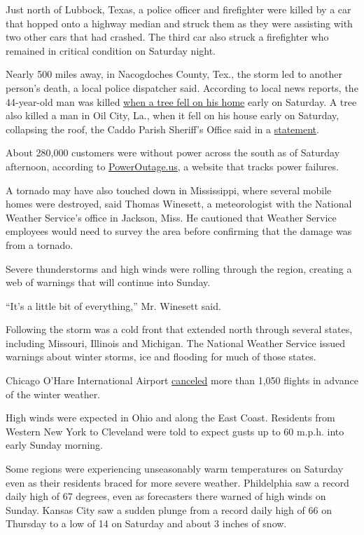 Just north of Lubbock, Texas, a police officer and firefighter were
killed by a car that hopped onto a highway median and struck them as
they were assisting with two other cars that had crashed. The third car
also struck a firefighter who remained in critical condition on Saturday
night.

Nearly 500 miles away, in Nacogdoches County, Tex., the storm led to
another person's death, a local police dispatcher said. According to
local news reports, the 44-year-old man was killed
\href{https://www.ktre.com/2020/01/11/one-dead-nacogdoches-county-after-tree-falls-home/}{when
a tree fell on his home} early on Saturday. A tree also killed a man in
Oil City, La., when it fell on his house early on Saturday, collapsing
the roof, the Caddo Parish Sheriff's Office said in a
\href{https://caddosheriff.org/news.php?c=2319\&}{statement}.

About 280,000 customers were without power across the south as of
Saturday afternoon, according to
\href{https://poweroutage.us/}{PowerOutage.us}, a website that tracks
power failures.

A tornado may have also touched down in Mississippi, where several
mobile homes were destroyed, said Thomas Winesett, a meteorologist with
the National Weather Service's office in Jackson, Miss. He cautioned
that Weather Service employees would need to survey the area before
confirming that the damage was from a tornado.

Severe thunderstorms and high winds were rolling through the region,
creating a web of warnings that will continue into Sunday.

``It's a little bit of everything,'' Mr. Winesett said.

Following the storm was a cold front that extended north through several
states, including Missouri, Illinois and Michigan. The National Weather
Service issued warnings about winter storms, ice and flooding for much
of those states.

Chicago O'Hare International Airport
\href{https://twitter.com/fly2ohare/status/1216090683364323329?s=20}{canceled}
more than 1,050 flights in advance of the winter weather.

High winds were expected in Ohio and along the East Coast. Residents
from Western New York to Cleveland were told to expect gusts up to 60
m.p.h. into early Sunday morning.

Some regions were experiencing unseasonably warm temperatures on
Saturday even as their residents braced for more severe weather.
Phildelphia saw a record daily high of 67 degrees, even as forecasters
there warned of high winds on Sunday. Kansas City saw a sudden plunge
from a record daily high of 66 on Thursday to a low of 14 on Saturday
and about 3 inches of snow.

